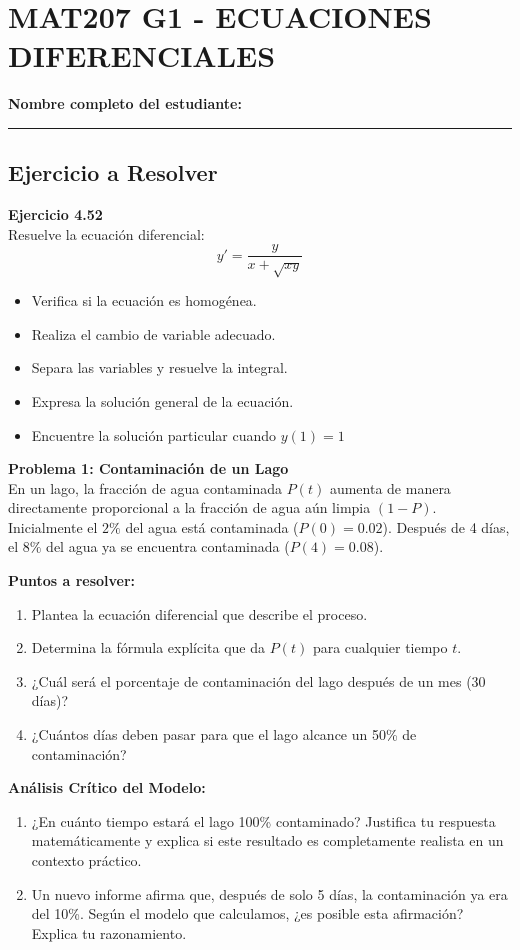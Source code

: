 \documentclass[8pt]{article}
\begin{document}
\section*{MAT207 G1 - ECUACIONES DIFERENCIALES}

\textbf{Nombre completo del estudiante:} \rule{12cm}{0.4pt}

\subsection*{Ejercicio a Resolver}
\textbf{Ejercicio 4.52}
\\
Resuelve la ecuaci\'on diferencial:
\[
y' = \frac{y}{x + \sqrt{xy}}
\]
\begin{itemize}[leftmargin=2em]
    \item Verifica si la ecuaci\'on es homog\'enea.
    \item Realiza el cambio de variable adecuado.
    \item Separa las variables y resuelve la integral.
    \item Expresa la soluci\'on general de la ecuaci\'on.
    \item Encuentre la soluci\'on particular cuando $y(1) = 1$
\end{itemize}


\textbf{Problema 1: Contaminaci\'on de un Lago}
\\
En un lago, la fracci\'on de agua contaminada $P(t)$ aumenta de manera directamente proporcional a la fracci\'on de agua a\'un limpia $(1-P)$. Inicialmente el $2\%$ del agua est\'a contaminada ($P(0) = 0.02$). Despu\'es de 4 d\'ias, el $8\%$ del agua ya se encuentra contaminada ($P(4) = 0.08$).

\textbf{Puntos a resolver:}
\begin{enumerate}[label=\textbf{\Alph*.},leftmargin=2em]
    \item Plantea la ecuaci\'on diferencial que describe el proceso.
    \item Determina la f\'ormula expl\'icita que da $P(t)$ para cualquier tiempo $t$.
    \item ¿Cuál será el porcentaje de contaminación del lago después de un mes (30 días)?
    \item ¿Cuántos días deben pasar para que el lago alcance un 50\% de contaminación?
\end{enumerate}

\textbf{An\'alisis Cr\'itico del Modelo:}
\begin{enumerate}[label=\textbf{E\arabic*.},leftmargin=2em]
    \item ¿En cuánto tiempo estará el lago 100\% contaminado? Justifica tu respuesta matemáticamente y explica si este resultado es completamente realista en un contexto práctico.
    \item Un nuevo informe afirma que, después de solo 5 días, la contaminación ya era del 10\%. Según el modelo que calculamos, ¿es posible esta afirmación? Explica tu razonamiento.
\end{enumerate}
\end{document}
